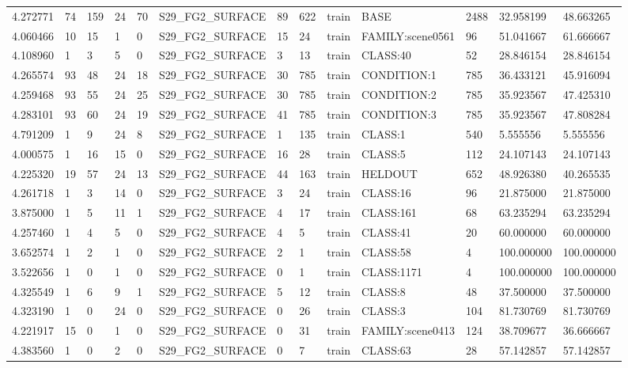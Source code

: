 \begin{tabular}{lllllllllllll}
4.272771 & 74 & 159 & 24 & 70 & S29\_FG2\_SURFACE & 89 & 622 & train & BASE & 2488 & 32.958199 & 48.663265 \\
4.060466 & 10 & 15 & 1 & 0 & S29\_FG2\_SURFACE & 15 & 24 & train & FAMILY:scene0561 & 96 & 51.041667 & 61.666667 \\
4.108960 & 1 & 3 & 5 & 0 & S29\_FG2\_SURFACE & 3 & 13 & train & CLASS:40 & 52 & 28.846154 & 28.846154 \\
4.265574 & 93 & 48 & 24 & 18 & S29\_FG2\_SURFACE & 30 & 785 & train & CONDITION:1 & 785 & 36.433121 & 45.916094 \\
4.259468 & 93 & 55 & 24 & 25 & S29\_FG2\_SURFACE & 30 & 785 & train & CONDITION:2 & 785 & 35.923567 & 47.425310 \\
4.283101 & 93 & 60 & 24 & 19 & S29\_FG2\_SURFACE & 41 & 785 & train & CONDITION:3 & 785 & 35.923567 & 47.808284 \\
4.791209 & 1 & 9 & 24 & 8 & S29\_FG2\_SURFACE & 1 & 135 & train & CLASS:1 & 540 & 5.555556 & 5.555556 \\
4.000575 & 1 & 16 & 15 & 0 & S29\_FG2\_SURFACE & 16 & 28 & train & CLASS:5 & 112 & 24.107143 & 24.107143 \\
4.225320 & 19 & 57 & 24 & 13 & S29\_FG2\_SURFACE & 44 & 163 & train & HELDOUT & 652 & 48.926380 & 40.265535 \\
4.261718 & 1 & 3 & 14 & 0 & S29\_FG2\_SURFACE & 3 & 24 & train & CLASS:16 & 96 & 21.875000 & 21.875000 \\
3.875000 & 1 & 5 & 11 & 1 & S29\_FG2\_SURFACE & 4 & 17 & train & CLASS:161 & 68 & 63.235294 & 63.235294 \\
4.257460 & 1 & 4 & 5 & 0 & S29\_FG2\_SURFACE & 4 & 5 & train & CLASS:41 & 20 & 60.000000 & 60.000000 \\
3.652574 & 1 & 2 & 1 & 0 & S29\_FG2\_SURFACE & 2 & 1 & train & CLASS:58 & 4 & 100.000000 & 100.000000 \\
3.522656 & 1 & 0 & 1 & 0 & S29\_FG2\_SURFACE & 0 & 1 & train & CLASS:1171 & 4 & 100.000000 & 100.000000 \\
4.325549 & 1 & 6 & 9 & 1 & S29\_FG2\_SURFACE & 5 & 12 & train & CLASS:8 & 48 & 37.500000 & 37.500000 \\
4.323190 & 1 & 0 & 24 & 0 & S29\_FG2\_SURFACE & 0 & 26 & train & CLASS:3 & 104 & 81.730769 & 81.730769 \\
4.221917 & 15 & 0 & 1 & 0 & S29\_FG2\_SURFACE & 0 & 31 & train & FAMILY:scene0413 & 124 & 38.709677 & 36.666667 \\
4.383560 & 1 & 0 & 2 & 0 & S29\_FG2\_SURFACE & 0 & 7 & train & CLASS:63 & 28 & 57.142857 & 57.142857 \\

\end{tabular}
